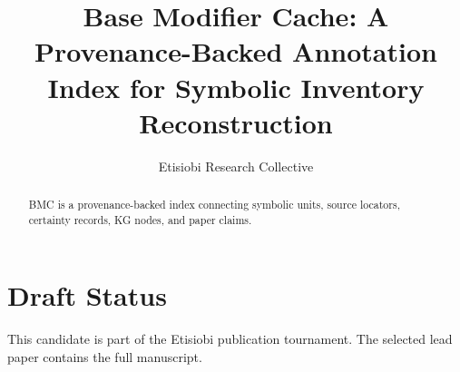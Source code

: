 \documentclass[manuscript]{acmart}
\title{Base Modifier Cache: A Provenance-Backed Annotation Index for Symbolic Inventory Reconstruction}
\author{Etisiobi Research Collective}
\affiliation{\institution{The Beaconsmith Collective}\country{Nigeria}}
\begin{document}
\begin{abstract}
BMC is a provenance-backed index connecting symbolic units, source locators, certainty records, KG nodes, and paper claims.
\end{abstract}
\maketitle
\section{Draft Status}
This candidate is part of the Etisiobi publication tournament. The selected lead paper contains the full manuscript.


\end{document}
